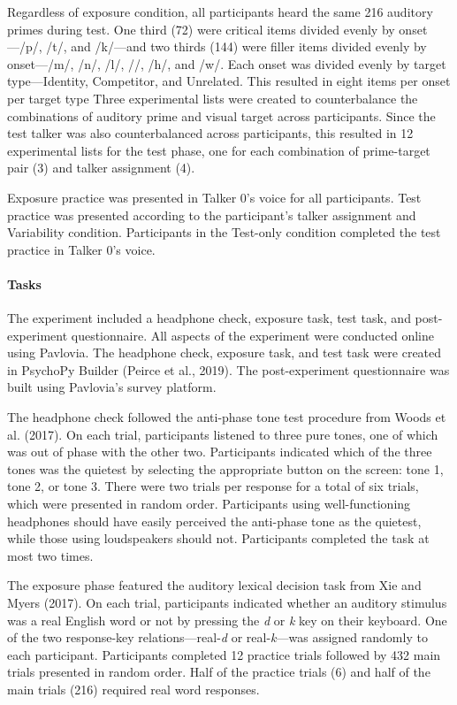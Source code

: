 \documentclass[
  12pt,
  twoside]{article}
\begin{document}
Regardless of exposure condition, all participants heard the same 216 auditory primes during test.
One third (72) were critical items divided evenly by onset---/p/, /t/, and /k/---and two thirds (144) were filler items divided evenly by onset---/m/, /n/, /l/, //, /h/, and /w/.
Each onset was divided evenly by target type---Identity, Competitor, and Unrelated.
This resulted in eight items per onset per target type
Three experimental lists were created to counterbalance the combinations of auditory prime and visual target across participants.
Since the test talker was also counterbalanced across participants, this resulted in 12 experimental lists for the test phase, one for each combination of prime-target pair (3) and talker assignment (4).

Exposure practice was presented in Talker 0's voice for all participants.
Test practice was presented according to the participant's talker assignment and Variability condition.
Participants in the Test-only condition completed the test practice in Talker 0's voice.

\hypertarget{methods-tasks-1a}{%
\paragraph{Tasks}\label{methods-tasks-1a}}

The experiment included a headphone check, exposure task, test task, and post-experiment questionnaire.
All aspects of the experiment were conducted online using Pavlovia.
The headphone check, exposure task, and test task were created in PsychoPy Builder (Peirce et al., 2019).
The post-experiment questionnaire was built using Pavlovia's survey platform.

The headphone check followed the anti-phase tone test procedure from Woods et al. (2017).
On each trial, participants listened to three pure tones, one of which was out of phase with the other two.
Participants indicated which of the three tones was the quietest by selecting the appropriate button on the screen: tone 1, tone 2, or tone 3.
There were two trials per response for a total of six trials, which were presented in random order.
Participants using well-functioning headphones should have easily perceived the anti-phase tone as the quietest, while those using loudspeakers should not.
Participants completed the task at most two times.

The exposure phase featured the auditory lexical decision task from Xie and Myers (2017).
On each trial, participants indicated whether an auditory stimulus was a real English word or not by pressing the \emph{d} or \emph{k} key on their keyboard.
One of the two response-key relations---real-\emph{d} or real-\emph{k}---was assigned randomly to each participant.
Participants completed 12 practice trials followed by 432 main trials presented in random order.
Half of the practice trials (6) and half of the main trials (216) required real word responses.
\end{document}
